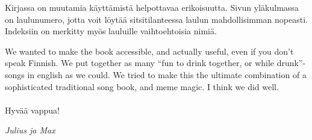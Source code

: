 Kirjassa on muutamia käyttämistä helpottavaa erikoisuutta. Sivun yläkulmassa on laulunumero, jotta
voit löytää sitsitilanteessa laulun mahdollisimman nopeasti. Indeksiin on merkitty myös lau\-luil\-le vaihtoehtoisia nimiä.

We wanted to make the book accessible, and actually useful, even if you don’t
speak Finnish. We put together as many “fun to drink together, or while drunk”-songs
in english as we could. We tried to make this the ultimate combination of a
sophisticated traditional song book, and meme magic. I think we did well.
\\
\\
Hyvää vappua!

\vfill
\textit{Julius ja Max}

\newpage
\blankpage
